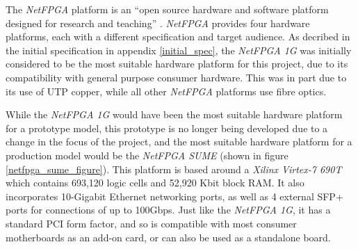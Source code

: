 

The \textit{NetFPGA} platform is an ``open source hardware and software platform designed for research and teaching'' \cite{NetFPGA}.
\textit{NetFPGA} provides four hardware platforms, each with a different specification and target audience. As decribed in the initial specification in appendix \ref{initial_spec}, the \textit{NetFPGA 1G} was initially considered to be the most suitable hardware platform for this project, due to its compatibility with general purpose consumer hardware.
This was in part due to its use of UTP copper, while all other \textit{NetFPGA} platforms use fibre optics.

While the \textit{NetFPGA 1G} would have been the most suitable hardware platform for a prototype model, this prototype is no longer being developed due to a change in the focus of the project, and the most suitable hardware platform for a production model would be the \textit{NetFPGA SUME} (shown in figure \ref{netfpga_sume_figure}). This platform is based around a \textit{Xilinx Virtex-7 690T} \cite{virtex7-690t} which contains 693,120 logic cells and 52,920 Kbit block RAM. It also incorporates 10-Gigabit Ethernet networking ports, as well as 4 external SFP+ ports for connections of up to 100Gbps. Just like the \textit{NetFPGA 1G}, it has a standard PCI form factor, and so is compatible with most consumer motherboards as an add-on card, or can also be used as a standalone board.


